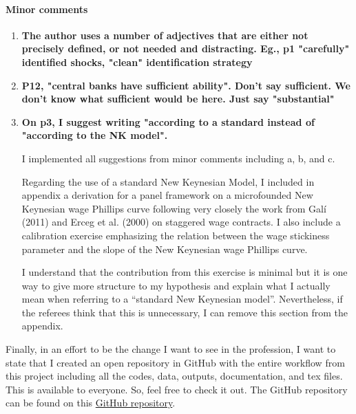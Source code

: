\documentclass[12pt]{article}
\begin{document}
\paragraph{Minor comments}

\begin{enumerate}
\item \textbf{The author uses a number of adjectives that are either not precisely defined, or not needed and distracting. Eg., p1 "carefully" identified shocks, "clean" identification strategy}

\item \textbf{P12, "central banks have sufficient ability". Don't say sufficient. We don't know what sufficient would be here. Just say "substantial"}

\item \textbf{On p3, I suggest writing "according to a standard instead of "according to the NK model".}

I implemented all suggestions from minor comments including a, b, and c.

Regarding the use of a standard New Keynesian Model, I included in appendix a derivation for a panel framework on a microfounded New Keynesian wage Phillips curve following very closely the work from Galí (2011) and Erceg et al. (2000) on staggered wage contracts. I also include a calibration exercise emphasizing the relation between the wage stickiness parameter and the slope of the New Keynesian wage Phillips curve.

I understand that the contribution from this exercise is minimal but it is one way to give more structure to my hypothesis and explain what I actually mean when referring to a “standard New Keynesian model”. Nevertheless, if the referees think that this is unnecessary, I can remove this section from the appendix.
\end{enumerate}

Finally, in an effort to be the change I want to see in the profession, I want to state that I created an open repository in GitHub with the entire workflow from this project including all the codes, data, outputs, documentation, and tex files. This is available to everyone. So, feel free to check it out. The GitHub repository can be found on this \href{https://github.com/RicardoGabriel/Monetary-Policy-and-the-Wage-Inflation-Unemployment-Tradeoff}{GitHub repository}.

\renewcommand\bibname{References}

\begin{singlespace}
	\setlength{\bibsep}{5pt}
	
	
\end{singlespace}
\end{document}
